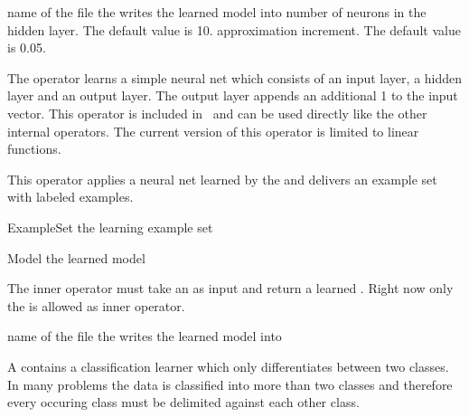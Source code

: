 
\learnerio

\begin{parameters}
 name of the file the  writes the learned model into
 number of neurons in the hidden layer. The default value is 10.
\optpar[lambda] approximation increment. The default value is 0.05.
\end{parameters}

\opdescr The operator learns a simple neural net which consists of an input layer,
a hidden layer and an output layer. The output layer appends an additional 1 to the input vector. 
This operator is included in \rapidminer\ and can be used directly like the other internal operators. 
%
The current version of this operator is limited to linear functions.




\applierio

\opdescr This operator applies a neural net learned by the  and
delivers an example set with labeled examples.




\begin{opin}
\item[ExampleSet] the learning example set
\end{opin}

\begin{opout}
\item[Model] the learned model
\end{opout}

\begin{innerops}
\item The inner operator must take an  as input and return a 
  learned . Right now only the  is allowed as
  inner operator.
\end{innerops}

\begin{parameters}
 name of the file the  writes the learned model into
\end{parameters}

\opdescr A  contains a classification learner
which only differentiates between two classes. In many problems the data is
classified into more than two classes and therefore every occuring
class must be delimited against each other class. 

